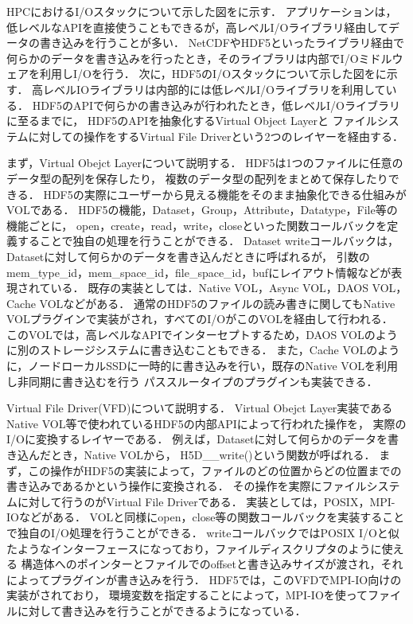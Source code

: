\documentclass[submit,techrep,noauthor]{ipsj}
\begin{document}
HPCにおけるI/Oスタックについて示した図をに示す．
アプリケーションは，低レベルなAPIを直接使うこともできるが，高レベルI/Oライブラリ経由してデータの書き込みを行うことが多い．
NetCDFやHDF5といったライブラリ経由で何らかのデータを書き込みを行ったとき，そのライブラリは内部でI/Oミドルウェアを利用しI/Oを行う．
次に，HDF5のI/Oスタックについて示した図をに示す．
高レベルIOライブラリは内部的には低レベルI/Oライブラリを利用している．
HDF5のAPIで何らかの書き込みが行われたとき，低レベルI/Oライブラリに至るまでに，
HDF5のAPIを抽象化するVirtual Object Layerと
ファイルシステムに対しての操作をするVirtual File Driverという2つのレイヤーを経由する．

まず，Virtual Obejct Layerについて説明する．
HDF5は1つのファイルに任意のデータ型の配列を保存したり，
複数のデータ型の配列をまとめて保存したりできる．
HDF5の実際にユーザーから見える機能をそのまま抽象化できる仕組みがVOLである．
HDF5の機能，Dataset，Group，Attribute，Datatype，File等の機能ごとに，
open，create，read，write，closeといった関数コールバックを定義することで独自の処理を行うことができる．
Dataset writeコールバックは，
Datasetに対して何らかのデータを書き込んだときに呼ばれるが，
引数のmem\_type\_id，mem\_space\_id，file\_space\_id，bufにレイアウト情報などが表現されている．
既存の実装としては．Native VOL，Async VOL，DAOS VOL，Cache VOLなどがある．
通常のHDF5のファイルの読み書きに関してもNative VOLプラグインで実装がされ，すべてのI/OがこのVOLを経由して行われる．
このVOLでは，高レベルなAPIでインターセプトするため，DAOS VOLのように別のストレージシステムに書き込むこともできる．
また，Cache VOLのように，ノードローカルSSDに一時的に書き込みを行い，既存のNative VOLを利用し非同期に書き込むを行う
パススルータイプのプラグインも実装できる．

Virtual File Driver(VFD)について説明する．
Virtual Obejct Layer実装であるNative VOL等で使われているHDF5の内部APIによって行われた操作を，
実際のI/Oに変換するレイヤーである．
例えば，Datasetに対して何らかのデータを書き込んだとき，Native VOLから，
H5D\_\_write()という関数が呼ばれる．
まず，この操作がHDF5の実装によって，ファイルのどの位置からどの位置までの書き込みであるかという操作に変換される．
その操作を実際にファイルシステムに対して行うのがVirtual File Driverである．
実装としては，POSIX，MPI-IOなどがある．
VOLと同様にopen，close等の関数コールバックを実装することで独自のI/O処理を行うことができる．
writeコールバックではPOSIX I/Oと似たようなインターフェースになっており，ファイルディスクリプタのように使える
構造体へのポインターとファイルでのoffsetと書き込みサイズが渡され，それによってプラグインが書き込みを行う．
HDF5では，このVFDでMPI-IO向けの実装がされており，
環境変数を指定することによって，MPI-IOを使ってファイルに対して書き込みを行うことができるようになっている．
\end{document}
